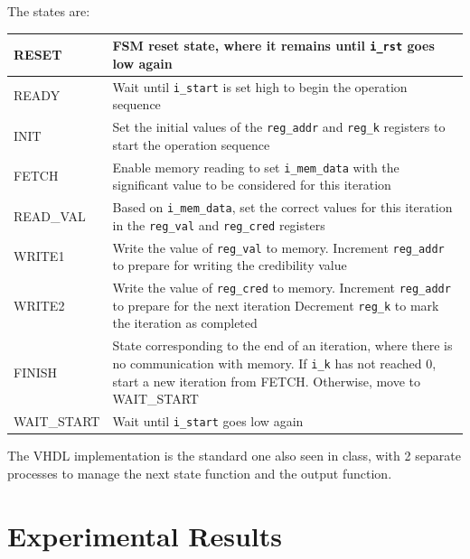 \documentclass{article}
\begin{document}
The states are:
\begin{table}[H]
    \centering
    \begin{tabular}{|l|p{15cm}|}
        \hline
        RESET & FSM reset state, where it remains until \texttt{i\_rst} goes low again \\
        \hline
        READY & Wait until \texttt{i\_start} is set high to begin the operation sequence \\
        \hline
        INIT & Set the initial values of the \texttt{reg\_addr} and \texttt{reg\_k} registers to start the operation sequence \\
        \hline
        FETCH & Enable memory reading to set \texttt{i\_mem\_data} with the significant value to be considered for this iteration \\
        \hline
        READ\_VAL & Based on \texttt{i\_mem\_data}, set the correct values for this iteration in the \texttt{reg\_val} and \texttt{reg\_cred} registers \\
        \hline
        WRITE1 & Write the value of \texttt{reg\_val} to memory. \newline Increment \texttt{reg\_addr} to prepare for writing the credibility value \\
        \hline
        WRITE2 & Write the value of \texttt{reg\_cred} to memory. \newline Increment \texttt{reg\_addr} to prepare for the next iteration \newline Decrement \texttt{reg\_k} to mark the iteration as completed \\
        \hline
        FINISH & State corresponding to the end of an iteration, where there is no communication with memory. If \texttt{i\_k} has not reached 0, start a new iteration from FETCH. Otherwise, move to WAIT\_START \\
        \hline
        WAIT\_START & Wait until \texttt{i\_start} goes low again \\
        \hline
    \end{tabular}
\end{table}

The VHDL implementation is the standard one also seen in class, with 2 separate processes to manage the next state function and the output function.
\section{Experimental Results}
\end{document}
